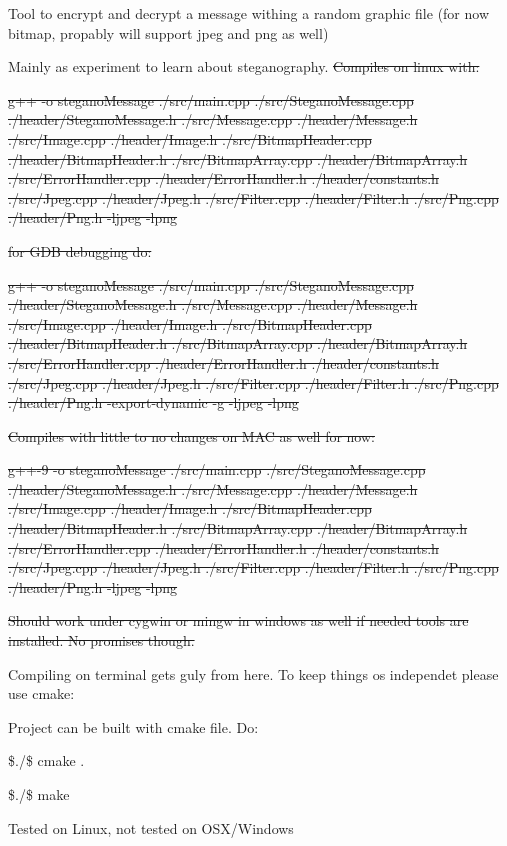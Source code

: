Tool to encrypt and decrypt a message withing a random graphic file (for now bitmap, propably will support jpeg and png as well)

Mainly as experiment to learn about steganography. \sout{Compiles on linux with\+:}

\sout{g++ -\/o stegano\+Message ./src/main.cpp ./src/\+Stegano\+Message.cpp ./header/\+Stegano\+Message.h ./src/\+Message.cpp ./header/\+Message.h ./src/\+Image.cpp ./header/\+Image.h ./src/\+Bitmap\+Header.cpp ./header/\+Bitmap\+Header.h ./src/\+Bitmap\+Array.cpp ./header/\+Bitmap\+Array.h ./src/\+Error\+Handler.cpp ./header/\+Error\+Handler.h ./header/constants.h ./src/\+Jpeg.cpp ./header/\+Jpeg.h ./src/\+Filter.cpp ./header/\+Filter.h ./src/\+Png.cpp ./header/\+Png.h -\/ljpeg -\/lpng}

\sout{for G\+DB debugging do\+:}

\sout{g++ -\/o stegano\+Message ./src/main.cpp ./src/\+Stegano\+Message.cpp ./header/\+Stegano\+Message.h ./src/\+Message.cpp ./header/\+Message.h ./src/\+Image.cpp ./header/\+Image.h ./src/\+Bitmap\+Header.cpp ./header/\+Bitmap\+Header.h ./src/\+Bitmap\+Array.cpp ./header/\+Bitmap\+Array.h ./src/\+Error\+Handler.cpp ./header/\+Error\+Handler.h ./header/constants.h ./src/\+Jpeg.cpp ./header/\+Jpeg.h ./src/\+Filter.cpp ./header/\+Filter.h ./src/\+Png.cpp ./header/\+Png.h -\/export-\/dynamic -\/g -\/ljpeg -\/lpng}

\sout{Compiles with little to no changes on M\+AC as well for now\+:}

\sout{g++-\/9 -\/o stegano\+Message ./src/main.cpp ./src/\+Stegano\+Message.cpp ./header/\+Stegano\+Message.h ./src/\+Message.cpp ./header/\+Message.h ./src/\+Image.cpp ./header/\+Image.h ./src/\+Bitmap\+Header.cpp ./header/\+Bitmap\+Header.h ./src/\+Bitmap\+Array.cpp ./header/\+Bitmap\+Array.h ./src/\+Error\+Handler.cpp ./header/\+Error\+Handler.h ./header/constants.h ./src/\+Jpeg.cpp ./header/\+Jpeg.h ./src/\+Filter.cpp ./header/\+Filter.h ./src/\+Png.cpp ./header/\+Png.h -\/ljpeg -\/lpng}

\sout{Should work under cygwin or mingw in windows as well if needed tools are installed. No promises though.}

Compiling on terminal gets guly from here. To keep things os independet please use cmake\+:

Project can be built with cmake file. Do\+:

\$./\$ cmake .

\$./\$ make

Tested on Linux, not tested on O\+S\+X/\+Windows 